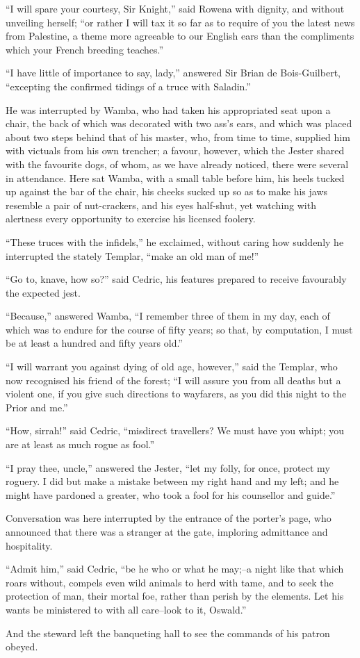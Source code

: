 ``I will spare your courtesy, Sir Knight,'' said Rowena with dignity,
and without unveiling herself; ``or rather I will tax it so far as to
require of you the latest news from Palestine, a theme more agreeable to
our English ears than the compliments which your French breeding
teaches.''

``I have little of importance to say, lady,'' answered Sir Brian de
Bois-Guilbert, ``excepting the confirmed tidings of a truce with
Saladin.''

He was interrupted by Wamba, who had taken his appropriated seat upon a
chair, the back of which was decorated with two ass's ears, and which
was placed about two steps behind that of his master, who, from time to
time, supplied him with victuals from his own trencher; a favour,
however, which the Jester shared with the favourite dogs, of whom, as we
have already noticed, there were several in attendance. Here sat Wamba,
with a small table before him, his heels tucked up against the bar of
the chair, his cheeks sucked up so as to make his jaws resemble a pair
of nut-crackers, and his eyes half-shut, yet watching with alertness
every opportunity to exercise his licensed foolery.

``These truces with the infidels,'' he exclaimed, without caring how
suddenly he interrupted the stately Templar, ``make an old man of me!''

``Go to, knave, how so?'' said Cedric, his features prepared to receive
favourably the expected jest.

``Because,'' answered Wamba, ``I remember three of them in my day, each
of which was to endure for the course of fifty years; so that, by
computation, I must be at least a hundred and fifty years old.''

``I will warrant you against dying of old age, however,'' said the
Templar, who now recognised his friend of the forest; ``I will assure
you from all deaths but a violent one, if you give such directions to
wayfarers, as you did this night to the Prior and me.''

``How, sirrah!'' said Cedric, ``misdirect travellers? We must have you
whipt; you are at least as much rogue as fool.''

``I pray thee, uncle,'' answered the Jester, ``let my folly, for once,
protect my roguery. I did but make a mistake between my right hand and
my left; and he might have pardoned a greater, who took a fool for his
counsellor and guide.''

Conversation was here interrupted by the entrance of the porter's page,
who announced that there was a stranger at the gate, imploring
admittance and hospitality.

``Admit him,'' said Cedric, ``be he who or what he may;--a night like
that which roars without, compels even wild animals to herd with tame,
and to seek the protection of man, their mortal foe, rather than perish
by the elements. Let his wants be ministered to with all care--look to
it, Oswald.''

And the steward left the banqueting hall to see the commands of his
patron obeyed.
